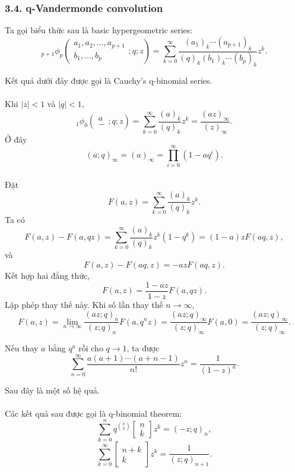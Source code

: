 \documentclass[11pt]{article}
\begin{document}
\subsubsection*{3.4. q-Vandermonde convolution}

Ta gọi biểu thức sau là basic hypergeometric series:
\[
  {}_{p+1}\phi_p
  \left(\begin{matrix}a_1,a_2,\ldots,a_{p+1}\\ b_1,\ldots,b_p\end{matrix};
  q;z\right)
  =
  \sum_{k=0}^{\infty}
  \frac{(a_1)_k\cdots(a_{p+1})_k}
       {(q)_k(b_1)_k\cdots(b_p)_k}z^k.
\]

Kết quả dưới đây được gọi là Cauchy's q-binomial series.

\paragraph{}
Khi \(|z|<1\) và \(|q|<1\),
\[
  {}_1\phi_0\left(\begin{matrix}a\\ -\end{matrix};q;z\right)
  =
  \sum_{k=0}^{\infty}\frac{(a)_k}{(q)_k}z^k
  =
  \frac{(az)_\infty}{(z)_\infty}.
\]
Ở đây
\[
  (a;q)_\infty=(a)_\infty=\prod_{i=0}^{\infty}(1-aq^i).
\]

\paragraph{}
Đặt
\[
  F(a,z)=\sum_{k=0}^{\infty}\frac{(a)_k}{(q)_k}z^k.
\]
Ta có
\[
  F(a,z)-F(a,qz)
  =
  \sum_{k=0}^{\infty}\frac{(a)_k}{(q)_k}z^k(1-q^k)
  =
  (1-a)zF(aq,z),
\]
và
\[
  F(a,z)-F(aq,z)=-azF(aq,z).
\]
Kết hợp hai đẳng thức,
\[
  F(a,z)=\frac{1-az}{1-z}F(a,qz).
\]
Lặp phép thay thế này. Khi số lần thay thế \(n\to\infty\),
\[
  F(a,z)=\lim_{n\to\infty}\frac{(az;q)_n}{(z;q)_n}F(a,q^nz)
  =
  \frac{(az;q)_\infty}{(z;q)_\infty}F(a,0)
  =
  \frac{(az;q)_\infty}{(z;q)_\infty}.
\]


Nếu thay \(a\) bằng \(q^a\) rồi cho \(q\to1\), ta được
\[
  \sum_{n=0}^{\infty}
  \frac{a(a+1)\cdots(a+n-1)}{n!}z^n
  =
  \frac{1}{(1-z)^a}.
\]

Sau đây là một số hệ quả.

\paragraph{}
Các kết quả sau được gọi là q-binomial theorem:
\[
  \sum_{k=0}^{n}
  q^{\binom{k}{2}}
  \left[\begin{matrix}n\\ k\end{matrix}\right]z^k
  =
  (-z;q)_n,
\]
\[
  \sum_{k=0}^{\infty}
  \left[\begin{matrix}n+k\\ k\end{matrix}\right]z^k
  =
  \frac{1}{(z;q)_{n+1}}.
\]
\end{document}
